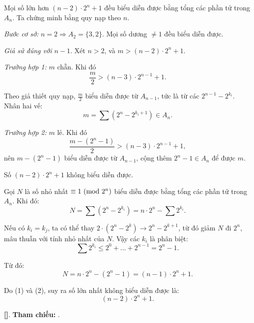 \documentclass[../2015-n-s.tex]{subfiles}
\begin{document}
\begin{soln}

	\begin{claim*}[1]
		Mọi số lớn hơn \( (n - 2) \cdot 2^n + 1 \) đều biểu diễn được bằng tổng các phần tử trong \( A_n \). Ta chứng minh bằng quy nạp theo \( n \).
	\end{claim*}
	\begin{subproof}

		\textit{Bước cơ sở:} \( n = 2 \Rightarrow A_2 = \{3, 2\} \). Mọi số dương \( \ne 1 \) đều biểu diễn được.

		\textit{Giả sử đúng với \( n - 1 \)}. Xét \( n > 2 \), và \( m > (n - 2) \cdot 2^n + 1 \).
	
		\textit{Trường hợp 1:} \( m \) chẵn. Khi đó
		\[
			\frac{m}{2} > (n - 3) \cdot 2^{n-1} + 1.
		\]

		Theo giả thiết quy nạp, \( \frac{m}{2} \) biểu diễn được từ \( A_{n-1} \), tức là từ các \( 2^{n-1} - 2^{k_i} \). Nhân hai vế:
		\[
			m = \sum (2^n - 2^{k_i + 1}) \in A_n.
		\]
	
		\textit{Trường hợp 2:} \( m \) lẻ. Khi đó
		\[
			\frac{m - (2^n - 1)}{2} > (n - 3) \cdot 2^{n-1} + 1,
		\]
		nên $m - (2^n - 1)$ biểu diễn được từ \( A_{n-1} \), cộng thêm \( 2^n - 1 \in A_n \) để được \( m \).
	\end{subproof}

	\begin{claim*}[2]
		Số \( (n - 2) \cdot 2^n + 1 \) không biểu diễn được.
	\end{claim*}
	\begin{subproof}
		Gọi \( N \) là số nhỏ nhất \( \equiv 1 \ (\mathrm{mod}\ 2^n) \) biểu diễn được bằng tổng các phần tử trong \( A_n \). Khi đó:
		\[
			N = \sum (2^n - 2^{k_i}) = n \cdot 2^n - \sum 2^{k_i}.
		\]
	
		Nếu có \( k_i = k_j \), ta có thể thay \( 2 \cdot (2^n - 2^k) \to 2^n - 2^{k+1} \),
		từ đó giảm \( N \) đi \( 2^n \), mâu thuẫn với tính nhỏ nhất của \( N \). Vậy các \( k_i \) là phân biệt:
		\[
			\sum 2^{k_i} \le 2^0 + \dots + 2^{n-1} = 2^n - 1.
		\]
	
		Từ đó:
		\[
			N = n \cdot 2^n - (2^n - 1) = (n - 1) \cdot 2^n + 1.
		\]
	\end{subproof}

	Do (1) và (2), suy ra số lớn nhất không biểu diễn được là:
	\[
		(n - 2) \cdot 2^n + 1.
	\]

	\vspace{1em}
	\textbf{[]}.
	\textbf{Tham chiếu:} .
\end{soln}

\end{document}
